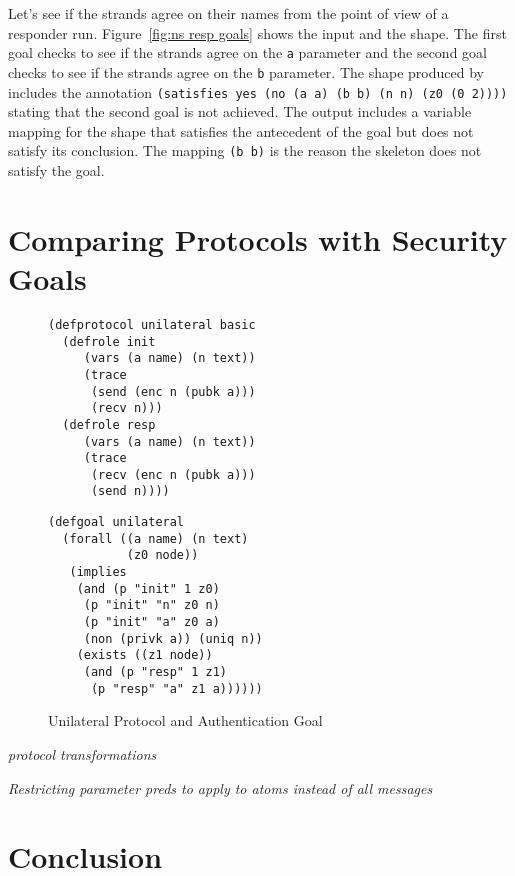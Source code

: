\documentclass[12pt]{article}
\begin{document}
Let's see if the strands agree on their names from the point of view
of a responder run.  Figure~\ref{fig:ns resp goals} shows the input
and the shape.  The first goal checks to see if the strands agree on
the \texttt{a} parameter and the second goal checks to see if the
strands agree on the \texttt{b} parameter.  The shape produced by
{\cpsa} includes the annotation \texttt{(satisfies yes (no (a a) (b b)
  (n n) (z0 (0 2))))} stating that the second goal is not achieved.
The output includes a variable mapping for the shape that
satisfies the antecedent of the goal but does not satisfy its
conclusion.  The mapping \texttt{(b b)} is the reason the skeleton
does not satisfy the goal.

\section{Comparing Protocols with Security Goals}\label{sec:comparing}

\begin{figure}
\begin{minipage}{2.7in}
\begin{verbatim}
(defprotocol unilateral basic
  (defrole init
     (vars (a name) (n text))
     (trace
      (send (enc n (pubk a)))
      (recv n)))
  (defrole resp
     (vars (a name) (n text))
     (trace
      (recv (enc n (pubk a)))
      (send n))))
\end{verbatim}
\end{minipage}\hfil
\begin{minipage}{3.0in}
\begin{verbatim}
(defgoal unilateral
  (forall ((a name) (n text)
           (z0 node))
   (implies
    (and (p "init" 1 z0)
     (p "init" "n" z0 n)
     (p "init" "a" z0 a)
     (non (privk a)) (uniq n))
    (exists ((z1 node))
     (and (p "resp" 1 z1) 
      (p "resp" "a" z1 a))))))
\end{verbatim}
\end{minipage}
\caption{Unilateral Protocol and Authentication Goal}\label{fig:unilateral}
\end{figure}

\emph{protocol transformations}

\emph{Restricting parameter preds to apply to atoms instead of all messages}

\section{Conclusion}\label{sec:conclusion}



\end{document}
